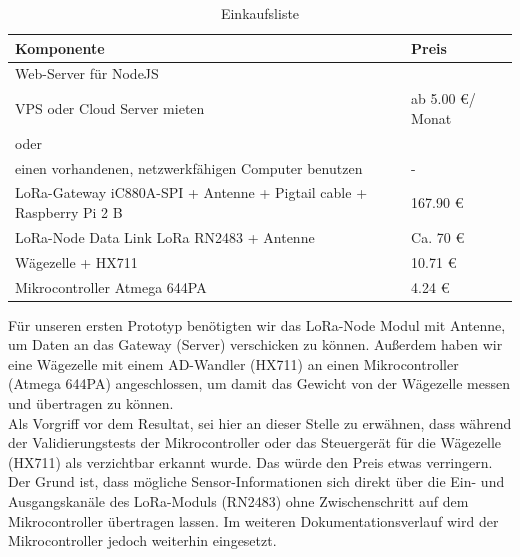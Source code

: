 \begin{table}[h]
    \caption{Einkaufsliste}
    \centering

    \begin{tabular}{ | l |  l | }
    \hline
    Komponente & Preis \\ \hline
    Web-Server für NodeJS  & \\
    VPS oder Cloud Server mieten & ab 5.00 \euro / Monat \\
    oder & \\
    einen vorhandenen, netzwerkfähigen Computer benutzen & - \\ \hline
    LoRa-Gateway iC880A-SPI + Antenne + Pigtail cable + Raspberry Pi 2 B & 167.90 \euro \\ \hline
    LoRa-Node Data Link LoRa RN2483 + Antenne & Ca. 70 \euro \\ \hline
    Wägezelle + HX711 & 10.71 \euro \\ \hline
    Mikrocontroller Atmega 644PA & 4.24 \euro \\ \hline
    \end{tabular}
\end{table}
Für unseren ersten Prototyp benötigten wir das LoRa-Node Modul mit Antenne, um Daten an das Gateway (Server) verschicken zu können. Außerdem haben wir eine Wägezelle mit einem AD-Wandler (HX711) an einen Mikrocontroller (Atmega 644PA) angeschlossen, um damit das Gewicht von der Wägezelle messen und übertragen zu können.\\
Als Vorgriff vor dem Resultat, sei hier an dieser Stelle zu erwähnen, dass während der Validierungstests der Mikrocontroller oder das Steuergerät für die Wägezelle (HX711) als verzichtbar erkannt wurde. Das würde den Preis etwas verringern. Der Grund ist, dass mögliche Sensor-Informationen sich direkt über die Ein- und Ausgangskanäle des LoRa-Moduls (RN2483) ohne Zwischenschritt auf dem Mikrocontroller übertragen lassen. Im weiteren Dokumentationsverlauf wird der Mikrocontroller jedoch weiterhin eingesetzt. \\

